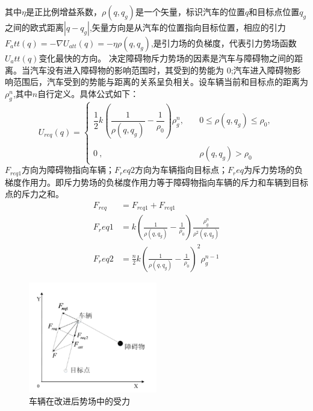 \documentclass{report}
\begin{document}
其中$\eta$是正比例增益系数，$\rho(q,q_g)$是一个矢量，标识汽车的位置$q$和目标点位置$q_g$之间的欧式距离$|q-q_g|$,矢量方向是从汽车的位置指向目标位置，相应的引力$F_att(q)=-\nabla U_{att}(q)=-\eta\rho(q,q_g)$,是引力场的负梯度，代表引力势场函数$U_att(q)$变化最快的方向。
\newpage
决定障碍物斥力势场的因素是汽车与障碍物之间的距离。当汽车没有进入障碍物的影响范围时，其受到的势能为 0;汽车进入障碍物影响范围后，汽车受到的势能与距离的关系呈负相关。设车辆当前和目标点的距离为$\rho_g^n$,其中$n$自行定义。具体公式如下：
$$U_{req}(q)=\begin{cases}\dfrac{1}{2}k\left(\dfrac{1}{\rho(q,q_g)}-\dfrac{1}{\rho_0}\right)\rho_g^n,&\quad0\leq\rho(q,q_g)\leq\rho_0,\\\\0\:,&\quad\rho(q,q_g)>\rho_0\end{cases}$$
$F_{req1}$方向为障碍物指向车辆；$F_req2$方向为车辆指向目标点；$F_req$为斥力势场的负梯度作用力。即斥力势场的负梯度作用力等于障碍物指向车辆的斥力和车辆到目标点的斥力之和。
\begin{align}
  \label{}
F_{req}&=F_{req1}+F_{req1}\\
F_req1&=k\left(\frac1{\rho(q,q_g)}-\frac1{\rho_0}\right)\frac{\rho_g^n}{\rho^2(q,q_g)}\\
F_req2&=\frac n2k\left(\frac1{\rho(q,q_g)}-\frac1{\rho_0}\right)^2\rho_g^{n-1}
\end{align}
\begin{figure}[ht]
  \centering
  \includegraphics[width=0.5\textwidth]{figures/APF.png}
  \caption{车辆在改进后势场中的受力}
\end{figure}
\end{document}
